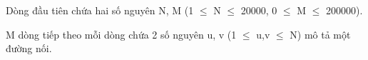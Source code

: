 Dòng đầu tiên chứa hai số nguyên N, M (1  $\le$  N  $\le$  20000, 0  $\le$  M  $\le$  200000).

M dòng tiếp theo mỗi dòng chứa 2 số nguyên u, v (1 $\le$ u,v  $\le$ N) mô tả một đường nối.

\